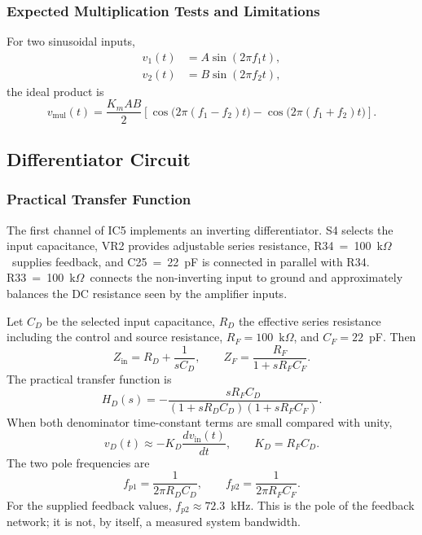 \documentclass[11pt,a4paper]{article}
\newcommand{\kohm}{\ensuremath{\mathrm{k}\Omega}}
\begin{document}
\subsubsection{Expected Multiplication Tests and Limitations}
For two sinusoidal inputs,
\begin{align}
v_1(t)&=A\sin(2\pi f_1t),\\
v_2(t)&=B\sin(2\pi f_2t),
\end{align}
the ideal product is
\begin{equation}
v_{\mathrm{mul}}(t)=\frac{K_mAB}{2}
\left[\cos\bigl(2\pi(f_1-f_2)t\bigr)-\cos\bigl(2\pi(f_1+f_2)t\bigr)\right].
\end{equation}

\subsection{Differentiator Circuit}
\subsubsection{Practical Transfer Function}
The first channel of IC5 implements an inverting differentiator. S4 selects the input capacitance, VR2 provides adjustable series resistance, R34~=~100~\kohm\ supplies feedback, and C25~=~22~pF is connected in parallel with R34. R33~=~100~\kohm\ connects the non-inverting input to ground and approximately balances the DC resistance seen by the amplifier inputs.

Let $C_D$ be the selected input capacitance, $R_D$ the effective series resistance including the control and source resistance, $R_F=100$~\kohm, and $C_F=22$~pF. Then
\begin{equation}
Z_{\mathrm{in}}=R_D+\frac{1}{sC_D},\qquad
Z_F=\frac{R_F}{1+sR_FC_F}.
\end{equation}
The practical transfer function is
\begin{equation}
\boxed{H_D(s)=-\frac{sR_FC_D}{(1+sR_DC_D)(1+sR_FC_F)}.}
\label{eq:diffpractical}
\end{equation}
When both denominator time-constant terms are small compared with unity,
\begin{equation}
v_D(t)\approx-K_D\frac{dv_{\mathrm{in}}(t)}{dt},\qquad K_D=R_FC_D.
\end{equation}
The two pole frequencies are
\begin{equation}
f_{p1}=\frac{1}{2\pi R_DC_D},\qquad
f_{p2}=\frac{1}{2\pi R_FC_F}.
\end{equation}
For the supplied feedback values, $f_{p2}\approx72.3$~kHz. This is the pole of the feedback network; it is not, by itself, a measured system bandwidth.
\end{document}
